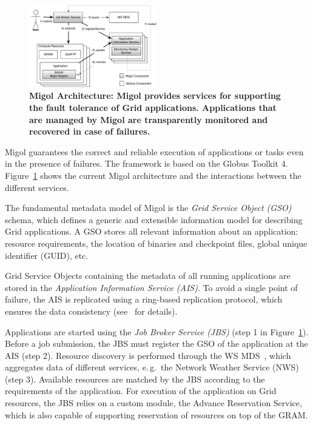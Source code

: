 \documentclass[times, 10pt, twocolumn]{article}
\newcommand{\up}{\vspace*{-1em}}
\begin{document}
\up
\begin{figure}[h]
 \centering
 \includegraphics[width=0.5\textwidth]{migol_architecture}
 \caption{\small \bf Migol Architecture: Migol provides services for
 supporting the fault tolerance of Grid applications. Applications that are managed by
 Migol are transparently monitored and recovered in case of
 failures.\up\up
 }
 \label{fig:migol_architecture} 
\end{figure}           


Migol guarantees the correct and reliable exe\-cution of applications or tasks even in
the presence of  failures. The framework is based on the Globus Toolkit 4. 
Figure~\ref{fig:migol_architecture} shows the current Migol architecture and 
the interactions between the different services.

The fundamental metadata model of Migol is the \emph{Grid Service Object (GSO)} schema,
which defines a generic and extensible information model for
describing Grid applications.  
A GSO stores all relevant information about an application: resource requirements,
the location of binaries and checkpoint files, global unique identifier (GUID),
etc.

Grid Service Objects containing the metadata of all running applications are stored in 
the {\em Application Information Service (AIS)}. 
To avoid a single point of failure, the AIS is replicated using a ring-based
replication protocol, which ensures the data consistency
(see~\cite{Luckow:2008ys} for details).

Applications are started using the {\em Job Broker Service (JBS)}
(step 1 in Figure~\ref{fig:migol_architecture}). Before a job
submission, the JBS must register the GSO of the application at the
AIS (step 2).  Resource discovery is performed through the WS
MDS~\cite{schopf06}, which aggregates data of different services,
e.\,g.\ the Network Weather Service (NWS)~\cite{NWS99} (step 3).
Available resources are matched by the JBS according to the
requirements of the application. For execution of the application 
on Grid resources, the JBS relies on a custom module, the 
Advance Reservation Service, which is also capable of supporting 
reservation of resources on top of the GRAM.
\end{document}
